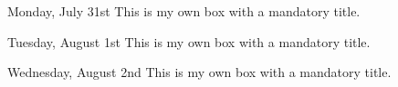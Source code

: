 \documentclass[11pt]{article}
\begin{document}
\begin{center}
\vspace{-1em}
\vspace{-0.5em}
\end{center}

\normalsize\begin{indigobox}{Monday, July 31st}
This is my own box with a mandatory title.
\end{indigobox}

\begin{center}
\vspace{-0.25em}
\vspace{-0.4em}
\end{center}

\normalsize\begin{indigobox}{Tuesday, August 1st}
This is my own box with a mandatory title.
\end{indigobox}

\begin{center}
\vspace{-0.25em}
\vspace{-0.4em}
\end{center}

\normalsize\begin{indigobox}{Wednesday, August 2nd}
This is my own box with a mandatory title.
\end{indigobox}
\end{document}
